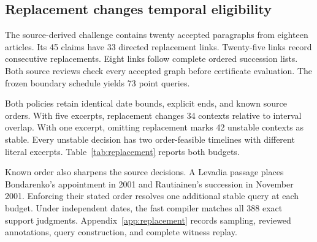 \subsection{Replacement changes temporal eligibility}
The source-derived challenge contains twenty accepted paragraphs from eighteen articles.
Its 45 claims have 33 directed replacement links.
Twenty-five links record consecutive replacements.
Eight links follow complete ordered succession lists.
Both source reviews check every accepted graph before certificate evaluation.
The frozen boundary schedule yields 73 point queries.

Both policies retain identical date bounds, explicit ends, and known source orders.
With five excerpts, replacement changes 34 contexts relative to interval overlap.
With one excerpt, omitting replacement marks 42 unstable contexts as stable.
Every unstable decision has two order-feasible timelines with different literal excerpts.
Table~\ref{tab:replacement} reports both budgets.


Known order also sharpens the source decisions.
A Levadia passage places Bondarenko's appointment in 2001 and Rautiainen's succession in November 2001.
Enforcing their stated order resolves one additional stable query at each budget.
Under independent dates, the fast compiler matches all 388 exact support judgments.
Appendix~\ref{app:replacement} records sampling, reviewed annotations, query construction, and complete witness replay.
